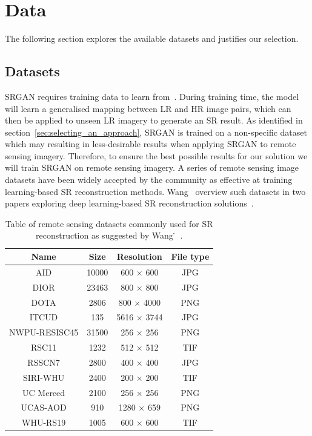 \section{Data}
The following section explores the available datasets and justifies our selection.

\subsection{Datasets}
SRGAN requires training data to learn from~\cite{srgan}. During training time, the model will learn a generalised mapping between LR and HR image pairs, which can then be applied to unseen LR imagery to generate an SR result. As identified in section~\ref{sec:selecting_an_approach}, SRGAN is trained on a non-specific dataset which may resulting in less-desirable results when applying SRGAN to remote sensing imagery. Therefore, to ensure the best possible results for our solution we will train SRGAN on remote sensing imagery. A series of remote sensing image datasets have been widely accepted by the community as effective at training learning-based SR reconstruction methods. Wang \etal\ overview such datasets in two papers exploring deep learning-based SR reconstruction solutions~\cite{remoteSensingDeepLearningReview, remoteSensingGANsReview}.
\begin{table}
    \centering
    \begin{tabular}{cccc}
        \toprule
        \textbf{Name} & \textbf{Size} & \textbf{Resolution} & \textbf{File type} \\
        \midrule
        AID & 10000 & 600 $\times$ 600 & JPG \\
        DIOR & 23463 & 800 $\times$ 800 & JPG \\
        DOTA & 2806 & 800 $\times$ 4000 & PNG \\
        ITCUD & 135 & 5616 $\times$ 3744 & JPG \\
        NWPU-RESISC45 & 31500 & 256 $\times$ 256 & PNG \\
        RSC11 & 1232 & 512 $\times$ 512 & TIF \\
        RSSCN7 & 2800 & 400 $\times$ 400 & JPG \\
        SIRI-WHU & 2400 & 200 $\times$ 200 & TIF \\
        UC Merced & 2100 & 256 $\times$ 256 & PNG \\
        UCAS-AOD & 910 & 1280 $\times$ 659 & PNG \\
        WHU-RS19 & 1005 & 600 $\times$ 600 & TIF \\
        \bottomrule
    \end{tabular}
    \caption{Table of remote sensing datasets commonly used for SR reconstruction as suggested by Wang \etal\.~\cite{remoteSensingDeepLearningReview,remoteSensingGANsReview}.}
    \label{table:datasets_table}
\end{table}

